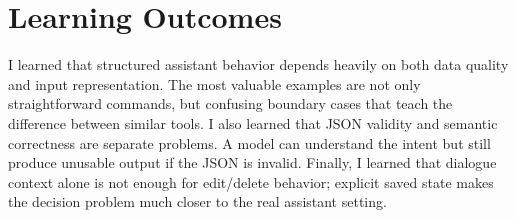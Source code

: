 \documentclass[11pt,a4paper]{article}
\begin{document}
\section{Learning Outcomes}

I learned that structured assistant behavior depends heavily on both data quality and input representation. The most valuable examples are not only straightforward commands, but confusing boundary cases that teach the difference between similar tools. I also learned that JSON validity and semantic correctness are separate problems. A model can understand the intent but still produce unusable output if the JSON is invalid. Finally, I learned that dialogue context alone is not enough for edit/delete behavior; explicit saved state makes the decision problem much closer to the real assistant setting.
\end{document}
